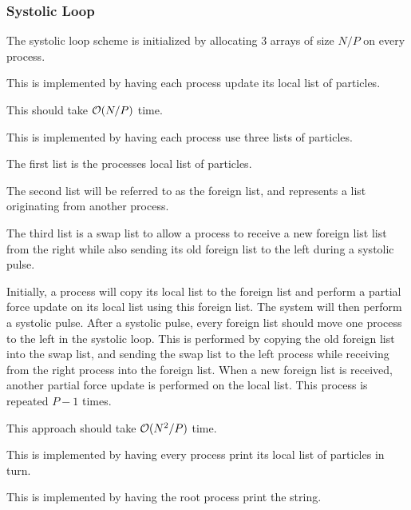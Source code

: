 \subsubsection{Systolic Loop}

The systolic loop scheme is initialized by allocating 3 arrays of
size $N/P$ on every process.

\begin{description}[style=nextline]
\item[individual\_operation]
    This is implemented by having each process update its local list
    of particles.

    This should take $\mathcal{O}{(N/P)}$ time.

\item[pair\_operation]
    This is implemented by having each process use three lists of particles.

    The first list is the processes local list of particles.

    The second list will be referred to as the foreign list, and
    represents a list originating from another process.

    The third list is a swap list to allow a process to receive a new
    foreign list list from the right
    while also sending its old foreign list to the left
    during a systolic pulse.

    Initially, a process will copy its local list to the foreign list
    and perform a partial force update on its local list using this
    foreign list.
    The system will then perform a systolic pulse.
    After a systolic pulse, every foreign list should move one process
    to the left in the systolic loop.
    This is performed by copying the old foreign list into the
    swap list, and sending the swap list to the left process while
    receiving from the right process into the foreign list.
    When a new foreign list is received, another partial force update
    is performed on the local list.
    This process is repeated $P-1$ times.

    This approach should take $\mathcal{O}{(N^2/P)}$ time.

\item[print\_particles]
    This is implemented by having every process print its local
    list of particles in turn.

\item[print\_string]
    This is implemented by having the root process print the string.

\end  {description}
